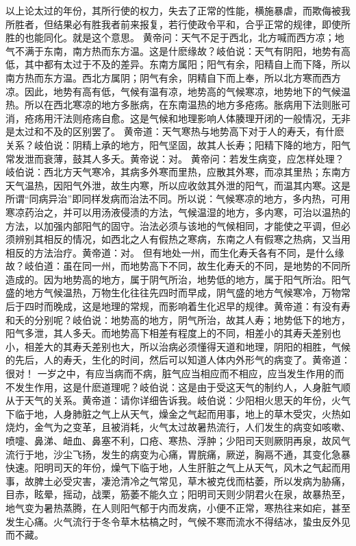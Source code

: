 \documentclass[12pt,UTF8]{ctexbook}
\begin{document}
以上论太过的年份，其所行使的权力，失去了正常的性能，横施暴虐，而欺侮被我所胜者，但结果必有胜我者前来报复，若行使政令平和，合乎正常的规律，即使所胜的也能同化。就是这个意思。
黄帝问：天气不足于西北，北方喊而西方凉；地气不满于东南，南方热而东方温。这是什麽缘故？岐伯说：天气有阴阳，地势有高低，其中都有太过于不及的差异。东南方属阳；阳气有余，阳精自上而下降，所以南方热而东方温。西北方属阴；阴气有余，阴精自下而上奉，所以北方寒而西方凉。因此，地势有高有低，气候有温有凉，地势高的气候寒凉，地势地下的气候温热。所以在西北寒凉的地方多胀病，在东南温热的地方多疮疡。胀病用下法则胀可消，疮疡用汗法则疮疡自愈。这是气候和地理影响人体腠理开闭的一般情况，无非是太过和不及的区别罢了。
黄帝道：天气寒热与地势高下对于人的寿夭，有什麽关系？岐伯说：阴精上承的地方，阳气坚固，故其人长寿；阳精下降的地方，阳气常发泄而衰薄，鼓其人多夭。黄帝说：对。
黄帝问：若发生病变，应怎样处理？岐伯说：西北方天气寒冷，其病多外寒而里热，应散其外寒，而凉其里热；东南方天气温热，因阳气外泄，故生内寒，所以应收敛其外泄的阳气，而温其内寒。这是所谓“同病异治”即同样发病而治法不同。所以说：气候寒凉的地方，多内热，可用寒凉药治之，并可以用汤液侵渍的方法，气候温湿的地方，多内寒，可治以温热的方法，以加强内部阳气的固守。治法必须与该地的气候相同，才能使之平调，但必须辨别其相反的情况，如西北之人有假热之寒病，东南之人有假寒之热病，又当用相反的方法治疗。黄帝道：对。
但有地处一州，而生化寿夭各有不同，是什么缘故？岐伯道：虽在同一州，而地势高下不同，故生化寿夭的不同，是地势的不同所造成的。因为地势高的地方，属于阴气所治，地势低的地方，属于阳气所治。阳气盛的地方气候温热，万物生化往往先四时而早成，阴气盛的地方气候寒冷，万物常后于四时而晚成，这是地理的常规，而影响着生化迟早的规律。黄帝道：有没有寿和夭的分别呢？岐伯说：地势高的地方，阴气所治，故其人寿；地势低下的地方，阳气多泄，其人多夭。而地势高下相差有程度上的不同，相差小的其寿夭差别也小，相差大的其寿夭差别也大，所以治病必须懂得天道和地理，阴阳的相胜，气候的先后，人的寿夭，生化的时间，然后可以知道人体内外形气的病变了。黄帝道：很对！
一岁之中，有应当病而不病，脏气应当相应而不相应，应当发生作用的而不发生作用，这是什麽道理呢？岐伯说：这是由于受这天气的制约人，人身脏气顺从于天气的关系。黄帝道：请你详细告诉我。岐伯说：少阳相火思天的年份，火气下临于地，人身肺脏之气上从天气，燥金之气起而用事，地上的草木受灾，火热如烧灼，金气为之变革，且被消耗，火气太过故暑热流行，人们发生的病变如咳嗽、喷嚏、鼻涕、衄血、鼻塞不利，口疮、寒热、浮肿；少阳司天则厥阴再泉，故风气流行于地，沙尘飞扬，发生的病变为心痛，胃脘痛，厥逆，胸鬲不通，其变化急暴快速。阳明司天的年份，燥气下临于地，人生肝脏之气上从天气，风木之气起而用事，故脾土必受灾害，凄沧清冷之气常见，草木被克伐而枯萎，所以发病为胁痛，目赤，眩晕，摇动，战栗，筋萎不能久立；阳明司天则少阴君火在泉，故暴热至，地气变为暑热蒸腾，在人则阳气郁于内而发病，小便不正常，寒热往来如疟，甚至发生心痛。火气流行于冬令草木枯槁之时，气候不寒而流水不得结冰，蛰虫反外见而不藏。
\end{document}
